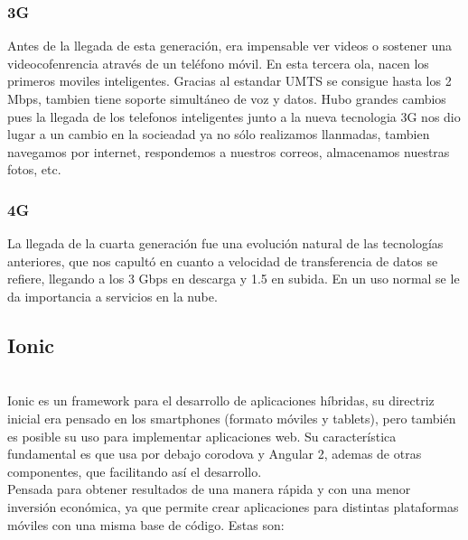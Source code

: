 \documentclass[a4paper, 11pt]{article}
\begin{document}
\begin{itemize}
            \subsubsection{3G}

              Antes de la llegada de esta generación, era impensable ver videos
              o sostener una videocofenrencia através de un teléfono móvil.
              En esta tercera ola, nacen los primeros moviles inteligentes.
              Gracias al estandar UMTS se consigue hasta los 2 Mbps, tambien
              tiene soporte simultáneo de voz y datos. Hubo grandes cambios
              pues la llegada de los telefonos inteligentes junto a la nueva
              tecnologia 3G nos dio lugar a un cambio en la socieadad ya no
              sólo realizamos llanmadas, tambien navegamos por internet, respondemos
              a nuestros correos, almacenamos nuestras fotos, etc.\\


            \subsubsection{4G}

              La llegada de la cuarta generación fue una evolución natural de
              las tecnologías anteriores, que nos capultó en cuanto a velocidad
              de transferencia de datos se refiere, llegando a los 3 Gbps en
              descarga y 1.5 en subida. En un uso normal se le da importancia a
              servicios en la nube.\\


        \subsection{Ionic}\\

            Ionic es un framework para el desarrollo de aplicaciones híbridas,
            su directriz inicial era pensado en los smartphones (formato móviles y
            tablets), pero también es posible su uso para implementar aplicaciones
            web. Su característica fundamental es que usa por debajo corodova y
            Angular 2, ademas de otras componentes, que facilitando así el
            desarrollo.\\

            Pensada para obtener resultados de una manera rápida y con una menor
            inversión económica, ya que permite crear aplicaciones para distintas
            plataformas móviles con una misma base de código. Estas son:\\



\end{itemize}
\end{document}
